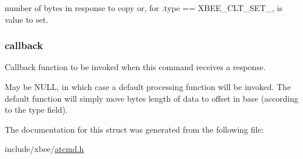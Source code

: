 number of bytes in response to copy or, for .type == X\-B\-E\-E\-\_\-\-C\-L\-T\-\_\-\-S\-E\-T\-\_, is value to set. 

\hypertarget{structxbee__atcmd__reg__t_a2611714f3f3d031a2c5f8202f2544567}{
\subsubsection[{callback}]{ callback}}\label{structxbee__atcmd__reg__t_a2611714f3f3d031a2c5f8202f2544567}


Callback function to be invoked when this command receives a response. 

May be N\-U\-L\-L, in which case a default processing function will be invoked. The default function will simply move {\ttfamily bytes} length of data to {\ttfamily offset} in {\ttfamily base} (according to the {\ttfamily type} field). 

The documentation for this struct was generated from the following file\-:\begin{DoxyCompactItemize}
\item 
include/xbee/\hyperlink{atcmd_8h}{atcmd.\-h}\end{DoxyCompactItemize}
